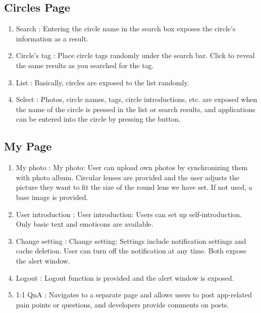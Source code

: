 \documentclass[conference]{IEEEtran}
\begin{document}
\subsection{Circles Page}
\begin{enumerate}
    \item Search : Entering the circle name in the search box exposes the circle's information as a result.
    \item Circle’s tag : Place circle tags randomly under the search bar. Click to reveal the same results as you searched for the tag.
    \item List : Basically, circles are exposed to the list randomly.
    \item Select : Photos, circle names, tags, circle introductions, etc. are exposed when the name of the circle is pressed in the list or search results, and applications can be entered into the circle by pressing the button.
\end{enumerate}
\subsection{My Page}
\begin{enumerate}
    \item My photo : My photo: User can upload own photos by synchronizing them with photo album. Circular lenses are provided and the user adjusts the picture they want to fit the size of the round lens we have set. If not used, a base image is provided.
    \item User introduction : User introduction: Users can set up self-introduction. Only basic text and emoticons are available.
    \item Change setting : Change setting: Settings include notification settings and cache deletion. User can turn off the notification at any time. Both expose the alert window.
    \item Logout : Logout function is provided and the alert window is exposed.
    \item 1:1 QnA : Navigates to a separate page and allows users to post app-related pain points or questions, and developers provide comments on posts.
\end{enumerate}
\end{document}
